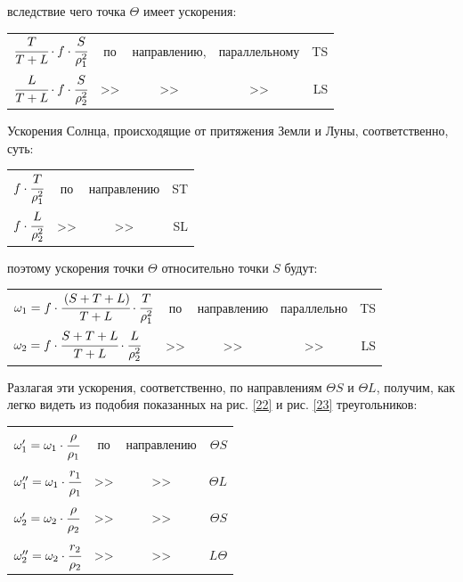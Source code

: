 \documentclass[a4paper,12pt]{article}
\begin{document}
\noindent вследствие чего точка $\Theta$ имеет ускорения:

\begin{table}[bhtp]
    \centering
    \begin{tabular}{c c c c r}
        $\cfrac{T}{T + L} \cdot f \cdot \cfrac{S}{\rho_1^2}$ & по & направлению, & параллельному & TS \\[4mm]
        $\cfrac{L}{T + L} \cdot f \cdot \cfrac{S}{\rho_2^2}$ & >> & >> & >> & LS
    \end{tabular}
\end{table}
Ускорения Солнца, происходящие от притяжения Земли и Луны, соответственно, суть:\\
\begin{table}[bhtp]
    \centering
    \begin{tabular}{l c c r}
        $f \cdot \cfrac{T}{\rho_1^2}$ & по & направлению & ST \\[4mm]
        $f \cdot \cfrac{L}{\rho_2^2}$ & >> & >> & SL 
    \end{tabular}
\end{table}

\noindent поэтому ускорения точки $\Theta$ относительно точки $S$ будут:

\begin{table}[bhtp]
    \centering
    \begin{tabular}{l c c c r}
        $\omega_1 = f \cdot \cfrac{\left(S+T+L\right)}{T+L} \cdot \cfrac{T}{\rho_1^2}$ & по & направлению & параллельно & TS \\[4mm]
        $\omega_2 = f \cdot \cfrac{S+T+L}{T+L} \cdot \cfrac{L}{\rho_2^2}$ & >> & >> & >> & LS 
    \end{tabular}
\end{table}

Разлагая эти ускорения, соответственно, по направлениям $\Theta S$ и $\Theta L$, получим, как легко видеть из подобия показанных на рис. \ref{22} и рис. \ref{23} треугольников:

\begin{longtable}{l c c r}
	$\omega_{1}' = \omega_1 \cdot \cfrac{\rho}{\rho_1}$ & по & направлению & $\Theta S$ \\
    $\omega_{1}'' = \omega_1 \cdot \cfrac{r_1}{\rho_1}$ & >> & >> & $\Theta L$ \\ 
    $\omega_{2}' = \omega_2 \cdot \cfrac{\rho}{\rho_2}$ & >> & >> & $\Theta S$ \\
    $\omega_{2}'' = \omega_2 \cdot \cfrac{r_2}{\rho_2}$ & >> & >> & $L\Theta$
\end{longtable}
\end{document}
